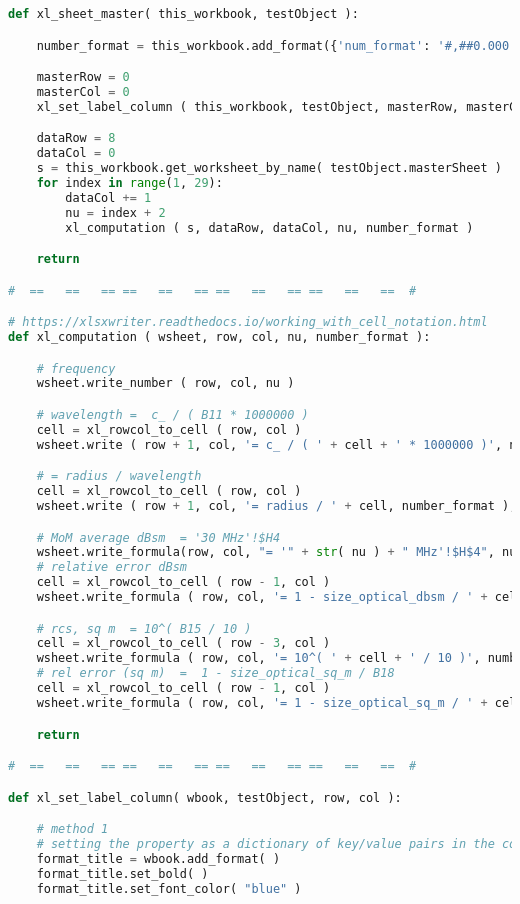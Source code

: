 {{\begin{lstlisting}[language=Python]
def xl_sheet_master( this_workbook, testObject ):

    number_format = this_workbook.add_format({'num_format': '#,##0.000'})

    masterRow = 0
    masterCol = 0
    xl_set_label_column ( this_workbook, testObject, masterRow, masterCol )

    dataRow = 8
    dataCol = 0
    s = this_workbook.get_worksheet_by_name( testObject.masterSheet )
    for index in range(1, 29):
        dataCol += 1
        nu = index + 2
        xl_computation ( s, dataRow, dataCol, nu, number_format )

    return

#  ==   ==   == ==   ==   == ==   ==   == ==   ==   ==  #

# https://xlsxwriter.readthedocs.io/working_with_cell_notation.html
def xl_computation ( wsheet, row, col, nu, number_format ):

    # frequency
    wsheet.write_number ( row, col, nu )

    # wavelength =  c_ / ( B11 * 1000000 )
    cell = xl_rowcol_to_cell ( row, col )
    wsheet.write ( row + 1, col, '= c_ / ( ' + cell + ' * 1000000 )', number_format ); row += 1

    # = radius / wavelength
    cell = xl_rowcol_to_cell ( row, col )
    wsheet.write ( row + 1, col, '= radius / ' + cell, number_format ); row += 3

    # MoM average dBsm  = '30 MHz'!$H4
    wsheet.write_formula(row, col, "= '" + str( nu ) + " MHz'!$H$4", number_format ); row += 1
    # relative error dBsm
    cell = xl_rowcol_to_cell ( row - 1, col )
    wsheet.write_formula ( row, col, '= 1 - size_optical_dbsm / ' + cell, number_format ); row += 2

    # rcs, sq m  = 10^( B15 / 10 )
    cell = xl_rowcol_to_cell ( row - 3, col )
    wsheet.write_formula ( row, col, '= 10^( ' + cell + ' / 10 )', number_format ); row += 1
    # rel error (sq m)  =  1 - size_optical_sq_m / B18
    cell = xl_rowcol_to_cell ( row - 1, col )
    wsheet.write_formula ( row, col, '= 1 - size_optical_sq_m / ' + cell, number_format )

    return

#  ==   ==   == ==   ==   == ==   ==   == ==   ==   ==  #

def xl_set_label_column( wbook, testObject, row, col ):

    # method 1
    # setting the property as a dictionary of key/value pairs in the constructor
    format_title = wbook.add_format( )
    format_title.set_bold( )
    format_title.set_font_color( "blue" )


\end{lstlisting}}}
